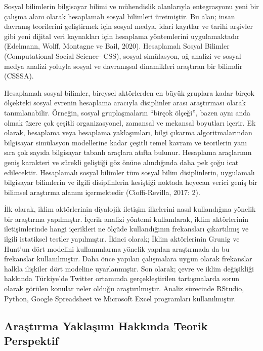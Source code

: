 \documentclass[
]{book}
\begin{document}
Sosyal bilimlerin bilgisayar bilimi ve mühendislik alanlarıyla entegrasyonu yeni bir çalışma alanı olarak hesaplamalı sosyal bilimleri üretmiştir. Bu alan; insan davranış teorilerini geliştirmek için sosyal medya, idari kayıtlar ve tarihi arşivler gibi yeni dijital veri kaynakları için hesaplama yöntemlerini uygulamaktadır (Edelmann, Wolff, Montagne ve Bail, 2020). Hesaplamalı Sosyal Bilimler (Computational Social Science- CSS), sosyal simülasyon, ağ analizi ve sosyal medya analizi yoluyla sosyal ve davranışsal dinamikleri araştıran bir bilimdir (CSSSA).

Hesaplamalı sosyal bilimler, bireysel aktörlerden en büyük gruplara kadar birçok ölçekteki sosyal evrenin hesaplama aracıyla disiplinler arası araştırması olarak tanımlanabilir. Örneğin, sosyal gruplaşmaların ``birçok ölçeği'', bazen aynı anda olmak üzere çok çeşitli organizasyonel, zamansal ve mekansal boyutları içerir. Ek olarak, hesaplama veya hesaplama yaklaşımları, bilgi çıkarma algoritmalarından bilgisayar simülasyon modellerine kadar çeşitli temel kavram ve teorilerin yanı sıra çok sayıda bilgisayar tabanlı araçlara atıfta bulunur. Hesaplama araçlarının geniş karakteri ve sürekli geliştiği göz önüne alındığında daha pek çoğu icat edilecektir. Hesaplamalı sosyal bilimler tüm sosyal bilim disiplinlerin, uygulamalı bilgisayar bilimlerin ve ilgili disiplinlerin kesiştiği noktada heyecan verici geniş bir bilimsel araştırma alanını içermektedir (Cioffi-Revilla, 2017: 2).

İlk olarak, iklim aktörlerinin diyalojik iletişim ilkelerini nasıl kullandığına yönelik bir araştırma yapılmıştır. İçerik analizi yöntemi kullanılarak, iklim aktörlerinin iletişimlerinde hangi içerikleri ne ölçüde kullandığının frekansları çıkartılmış ve ilgili istatiksel testler yapılmıştır. İkinci olarak; İklim aktörlerinin Grunig ve Hunt'un dört modelini kullanımlarına yönelik yapılan araştırmada da bu frekanslar kullanılmıştır. Daha önce yapılan çalışmalara uygun olarak frekanslar halkla ilişkiler dört modeline uyarlanmıştır. Son olarak; çevre ve iklim değişikliği hakkında Türkiye'de Twitter ortamında gerçekleştirilen tartışmalarda sorun olarak görülen konular neler olduğu araştırılmıştır. Analiz sürecinde RStudio, Python, Google Spreadsheet ve Microsoft Excel programları kullanılmıştır.

\hypertarget{araux15ftux131rma-yaklaux15fux131mux131-hakkux131nda-teorik-perspektif}{%
\subsection{Araştırma Yaklaşımı Hakkında Teorik Perspektif}\label{araux15ftux131rma-yaklaux15fux131mux131-hakkux131nda-teorik-perspektif}}
\end{document}
